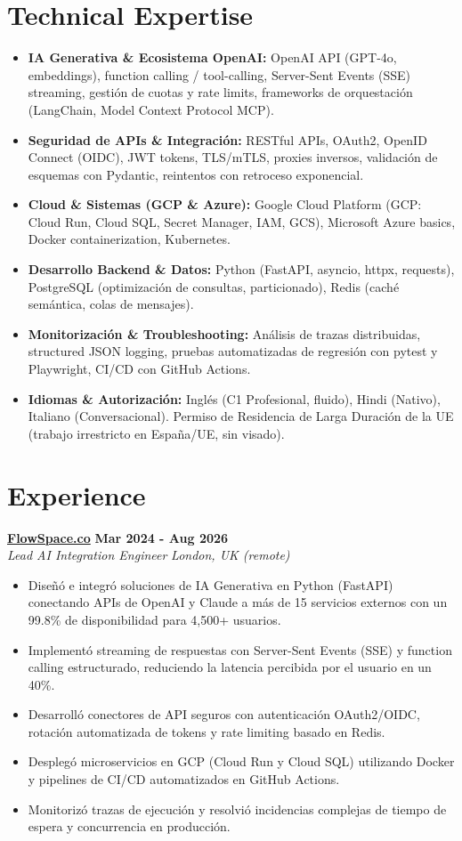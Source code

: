 \documentclass[10pt,a4paper]{article}
\newcommand{\role}[4]{%
  \textbf{#1} \hfill \textbf{#2}\\[1pt]%
  \textit{#3} \hfill \textit{#4}\\[2pt]%
}
\begin{document}
\section{Technical Expertise}
\begin{itemize}
  \item \textbf{IA Generativa \& Ecosistema OpenAI:} OpenAI API (GPT-4o, embeddings), function calling / tool-calling, Server-Sent Events (SSE) streaming, gestión de cuotas y rate limits, frameworks de orquestación (LangChain, Model Context Protocol MCP).
  \item \textbf{Seguridad de APIs \& Integración:} RESTful APIs, OAuth2, OpenID Connect (OIDC), JWT tokens, TLS/mTLS, proxies inversos, validación de esquemas con Pydantic, reintentos con retroceso exponencial.
  \item \textbf{Cloud \& Sistemas (GCP \& Azure):} Google Cloud Platform (GCP: Cloud Run, Cloud SQL, Secret Manager, IAM, GCS), Microsoft Azure basics, Docker containerization, Kubernetes.
  \item \textbf{Desarrollo Backend \& Datos:} Python (FastAPI, asyncio, httpx, requests), PostgreSQL (optimización de consultas, particionado), Redis (caché semántica, colas de mensajes).
  \item \textbf{Monitorización \& Troubleshooting:} Análisis de trazas distribuidas, structured JSON logging, pruebas automatizadas de regresión con pytest y Playwright, CI/CD con GitHub Actions.
  \item \textbf{Idiomas \& Autorización:} Inglés (C1 Profesional, fluido), Hindi (Nativo), Italiano (Conversacional). Permiso de Residencia de Larga Duración de la UE (trabajo irrestricto en España/UE, sin visado).
\end{itemize}

\section{Experience}

\role{\href{https://flowspace.co}{FlowSpace.co}}{Mar 2024 - Aug 2026}{Lead AI Integration Engineer}{London, UK (remote)}
\begin{itemize}
  \item Diseñó e integró soluciones de IA Generativa en Python (FastAPI) conectando APIs de OpenAI y Claude a más de 15 servicios externos con un 99.8\% de disponibilidad para 4,500+ usuarios.
  \item Implementó streaming de respuestas con Server-Sent Events (SSE) y function calling estructurado, reduciendo la latencia percibida por el usuario en un 40\%.
  \item Desarrolló conectores de API seguros con autenticación OAuth2/OIDC, rotación automatizada de tokens y rate limiting basado en Redis.
  \item Desplegó microservicios en GCP (Cloud Run y Cloud SQL) utilizando Docker y pipelines de CI/CD automatizados en GitHub Actions.
  \item Monitorizó trazas de ejecución y resolvió incidencias complejas de tiempo de espera y concurrencia en producción.
\end{itemize}
\end{document}
